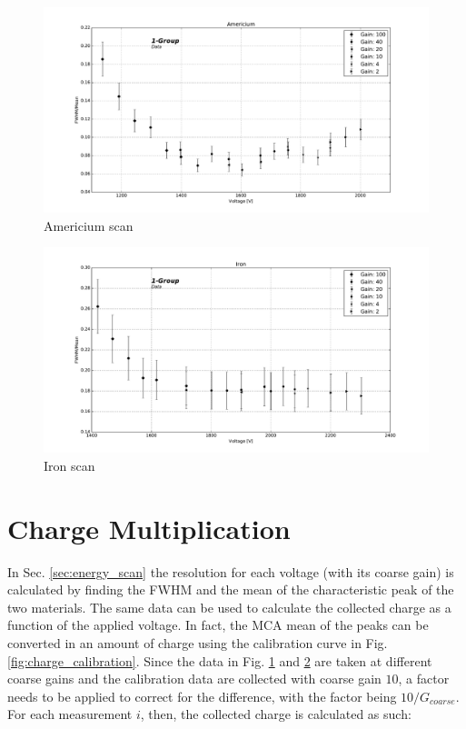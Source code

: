 \begin{figure}[htb]
  \includegraphics[width=\linewidth]{graphics/americium_scan}
  \caption{Americium scan}
  \label{fig:resolution:americium}
\end{figure}

\begin{figure}[htb]
  \includegraphics[width=\linewidth]{graphics/iron_scan}
  \caption{Iron scan}
  \label{fig:resolution:iron}
\end{figure}



\section{Charge Multiplication}
\label{sec:systematics}

In Sec. \ref{sec:energy_scan} the resolution for each voltage (with its coarse gain) is calculated by finding the FWHM and the mean of the characteristic peak of the two materials.
The same data can be used to calculate the collected charge as a function of the applied voltage. In fact, the MCA mean of the peaks can be converted in an amount of charge using the calibration curve in Fig. \ref{fig:charge_calibration}. Since the data in Fig. \ref{fig:resolution:americium} and \ref{fig:resolution:iron} are taken at different coarse gains and the calibration data are collected with coarse gain $10$, a factor needs to be applied to correct for the difference, with the factor being $10/G_{coarse}$. For each measurement $i$, then, the collected charge is calculated as such:

